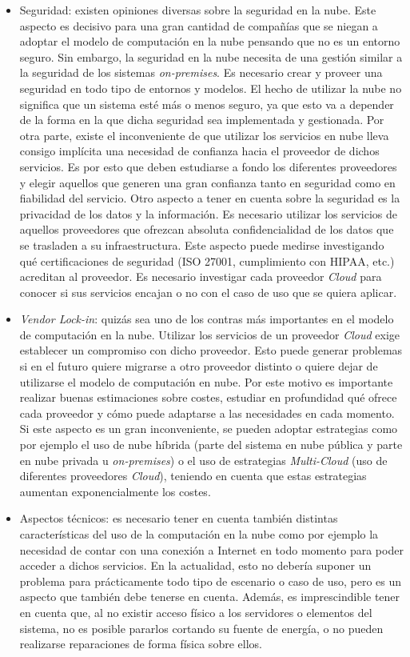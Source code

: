 \documentclass[../../memoria.tex]{subfiles}
\begin{document}
\begin{itemize}
    \item Seguridad: existen opiniones diversas sobre la seguridad en la nube. Este aspecto es decisivo para una gran cantidad de compañías que se niegan a adoptar el modelo de computación en la nube pensando que no es un entorno seguro. Sin embargo, la seguridad en la nube necesita de una gestión similar a la seguridad de los sistemas \textit{on-premises}. Es necesario crear y proveer una seguridad en todo tipo de entornos y modelos. El hecho de utilizar la nube no significa que un sistema esté más o menos seguro, ya que esto va a depender de la forma en la que dicha seguridad sea implementada y gestionada. Por otra parte, existe el inconveniente de que utilizar los servicios en nube lleva consigo implícita una necesidad de confianza hacia el proveedor de dichos servicios. Es por esto que deben estudiarse a fondo los diferentes proveedores y elegir aquellos que generen una gran confianza tanto en seguridad como en fiabilidad del servicio. Otro aspecto a tener en cuenta sobre la seguridad es la privacidad de los datos y la información. Es necesario utilizar los servicios de aquellos proveedores que ofrezcan absoluta confidencialidad de los datos que se trasladen a su infraestructura. Este aspecto puede medirse investigando qué certificaciones de seguridad (ISO 27001, cumplimiento con HIPAA, etc.) acreditan al proveedor. Es necesario investigar cada proveedor \textit{Cloud} para conocer si sus servicios encajan o no con el caso de uso que se quiera aplicar.

    \item \textit{Vendor Lock-in}: quizás sea uno de los contras más importantes en el modelo de computación en la nube. Utilizar los servicios de un proveedor \textit{Cloud} exige establecer un compromiso con dicho proveedor. Esto puede generar problemas si en el futuro quiere migrarse a otro proveedor distinto o quiere dejar de utilizarse el modelo de computación en nube. Por este motivo es importante realizar buenas estimaciones sobre costes, estudiar en profundidad qué ofrece cada proveedor y cómo puede adaptarse a las necesidades en cada momento. Si este aspecto es un gran inconveniente, se pueden adoptar estrategias como por ejemplo el uso de nube híbrida (parte del sistema en nube pública y parte en nube privada u \textit{on-premises}) o el uso de estrategias \textit{Multi-Cloud} (uso de diferentes proveedores \textit{Cloud}), teniendo en cuenta que estas estrategias aumentan exponencialmente los costes.

    \item Aspectos técnicos: es necesario tener en cuenta también distintas características del uso de la computación en la nube como por ejemplo la necesidad de contar con una conexión a Internet en todo momento para poder acceder a dichos servicios. En la actualidad, esto no debería suponer un problema para prácticamente todo tipo de escenario o caso de uso, pero es un aspecto que también debe tenerse en cuenta. Además, es imprescindible tener en cuenta que, al no existir acceso físico a los servidores o elementos del sistema, no es posible pararlos cortando su fuente de energía, o no pueden realizarse reparaciones de forma física sobre ellos.
\end{itemize}
\end{document}

